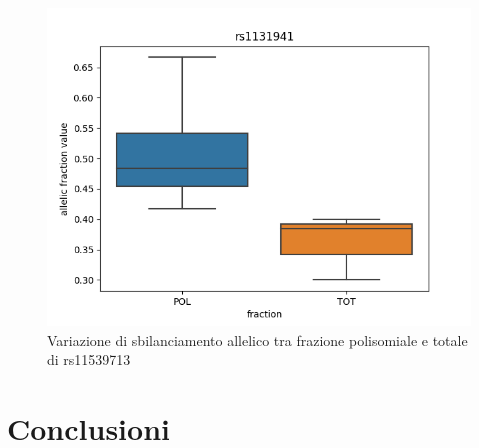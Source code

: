 \begin{figure}[H]
  \centering
  \includegraphics[scale=0.5]{boxplot/scr_DMSO_rs1131941.png}
  \caption{Variazione di sbilanciamento allelico tra frazione polisomiale e totale di rs11539713}
  \label{fig:KIF5B}
\end{figure}



\section{Conclusioni}
\label{sec:ending}

